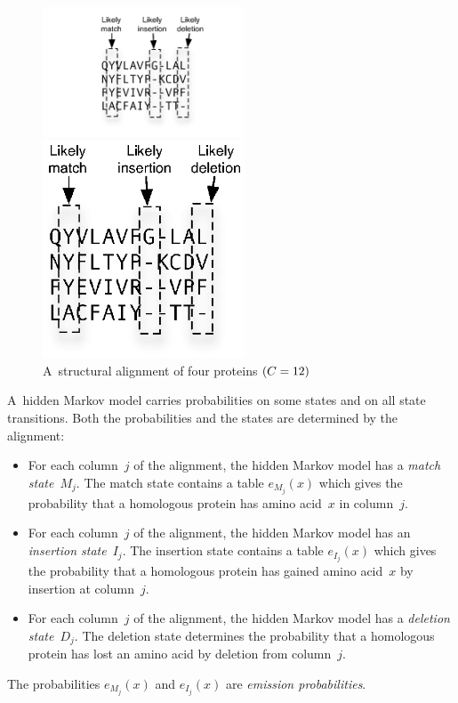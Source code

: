 \documentclass[preprint,nonatbib,blockstyle,times]{sigplanconf}
\newcommand\alignwidth{\ensuremath C} %
\begin{document}
\begin{figure}
\ifpdfmadness
\centerline{\includegraphics[width=6cm]{alignment.pdf}} 
\else
\centerline{\includegraphics[width=6cm]{alignment.eps}} 
\fi

\caption{A~structural alignment of four proteins $(\alignwidth = 12)$}
\label{alignment} 
\end{figure}



A~hidden Markov model carries probabilities on some states and on all
state transitions.
Both the probabilities and the states are determined by the alignment:
\begin{itemize}
\item
For each column~$j$ of the alignment, the hidden Markov model has a
\emph{match state}~$M_j$.
The match state contains a table $e_{M_j}(x)$ which gives the
 probability that a homologous protein has amino acid~$x$ in
 column~$j$.
\item 
For each column~$j$ of the alignment, the hidden Markov model has an
\emph{insertion state}~$I_j$.
The insertion state contains a table $e_{I_j}(x)$ which gives the
probability that a homologous protein has gained amino acid~$x$ by
insertion at column~$j$.
\item
For each column~$j$ of the alignment, the hidden Markov model has a
\emph{deletion state}~$D_j$.
The deletion state determines the probability that a homologous protein
has lost an amino acid by deletion from column~$j$.
\end{itemize}
The probabilities $e_{M_j}(x)$ and $e_{I_j}(x)$ are \emph{emission probabilities}.
\end{document}
